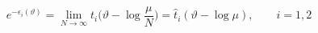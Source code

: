 \begin{equation}
e^{-\epsilon_i(\vartheta)}=\lim_{N\to\infty} t_i\Big(\vartheta-\log\frac{\mu}{N}\Big)
=\hat{t}_i(\vartheta-\log\mu),\qquad i=1,2
\end{equation}

